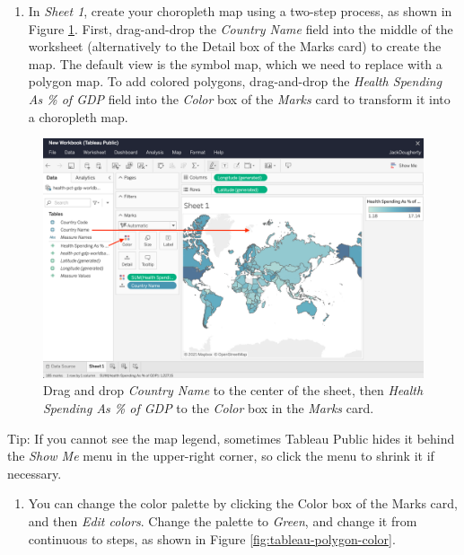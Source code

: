 \documentclass[
  english,
]{book}
\providecommand{\tightlist}{%
  \setlength{\itemsep}{0pt}\setlength{\parskip}{0pt}}
\begin{document}
\begin{enumerate}
\def\labelenumi{\arabic{enumi}.}
\setcounter{enumi}{5}
\tightlist
\item
  In \emph{Sheet 1}, create your choropleth map using a two-step process, as shown in Figure \ref{fig:tableau-drag}. First, drag-and-drop the \emph{Country Name} field into the middle of the worksheet (alternatively to the Detail box of the Marks card) to create the map. The default view is the symbol map, which we need to replace with a polygon map. To add colored polygons, drag-and-drop the \emph{Health Spending As \% of GDP} field into the \emph{Color} box of the \emph{Marks} card to transform it into a choropleth map.
\end{enumerate}



\begin{figure}
\centering
\includegraphics{images/07-map/tableau-drag-annotated.png}
\caption{\label{fig:tableau-drag}Drag and drop \emph{Country Name} to the center of the sheet, then \emph{Health Spending As \% of GDP} to the \emph{Color} box in the \emph{Marks} card.}
\end{figure}

Tip: If you cannot see the map legend, sometimes Tableau Public hides it behind the \emph{Show Me} menu in the upper-right corner, so click the menu to shrink it if necessary.

\begin{enumerate}
\def\labelenumi{\arabic{enumi}.}
\setcounter{enumi}{6}
\tightlist
\item
  You can change the color palette by clicking the Color box of the Marks card, and
  then \emph{Edit colors}. Change the palette to \emph{Green}, and change it from continuous to steps,
  as shown in Figure \ref{fig:tableau-polygon-color}.
\end{enumerate}
\end{document}
